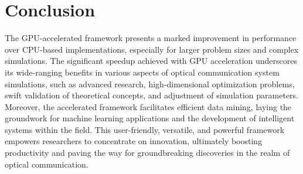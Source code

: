 \section{Conclusion}
The GPU-accelerated framework presents a marked improvement in performance over CPU-based implementations, especially for larger problem sizes and complex simulations. The significant speedup achieved with GPU acceleration underscores its wide-ranging benefits in various aspects of optical communication system simulations, such as advanced research, high-dimensional optimization problems, swift validation of theoretical concepts, and adjustment of simulation parameters. Moreover, the accelerated framework facilitates efficient data mining, laying the groundwork for machine learning applications and the development of intelligent systems within the field. This user-friendly, versatile, and powerful framework empowers researchers to concentrate on innovation, ultimately boosting productivity and paving the way for groundbreaking discoveries in the realm of optical communication.